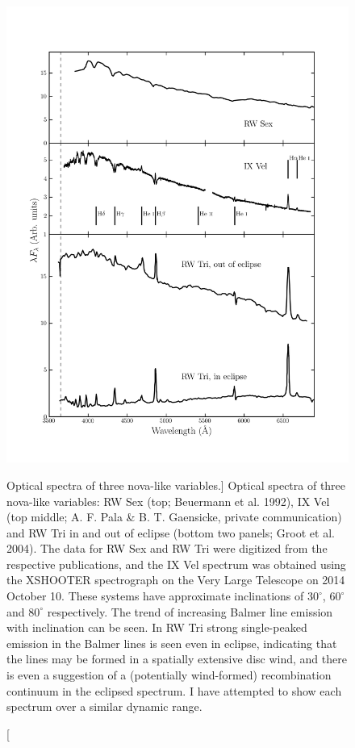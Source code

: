 \begin{figure}
\centering
\includegraphics[width=1.0\textwidth, clip=true, trim= 0 0.6in 0 0.8in]{figures/01-intro/novalikes.png}
\caption
[Optical spectra of three nova-like variables.]
{
Optical spectra of three nova-like variables: 
RW Sex (top; Beuermann et al. 1992),
IX Vel (top middle; A. F. Pala \& B. T. Gaensicke, private communication) 
and RW Tri in and out of eclipse (bottom two panels; Groot et al. 2004).
The data for RW Sex and RW Tri were digitized from the respective publications,
and the IX Vel spectrum was obtained using the XSHOOTER spectrograph 
on the Very Large Telescope on 2014 October 10.
These systems have approximate inclinations of 
$30^\circ$, $60^\circ$ and $80^\circ$ respectively. 
The trend of increasing Balmer line emission with inclination can be seen.
In RW Tri strong single-peaked emission in the Balmer lines is seen even
in eclipse, indicating that the lines may be formed in a spatially
extensive disc wind, and there is even a suggestion 
of a (potentially wind-formed) recombination continuum in the eclipsed
spectrum. I have attempted to show each spectrum over a similar dynamic range.
} 
\label{fig:NL_spec}
\end{figure}

